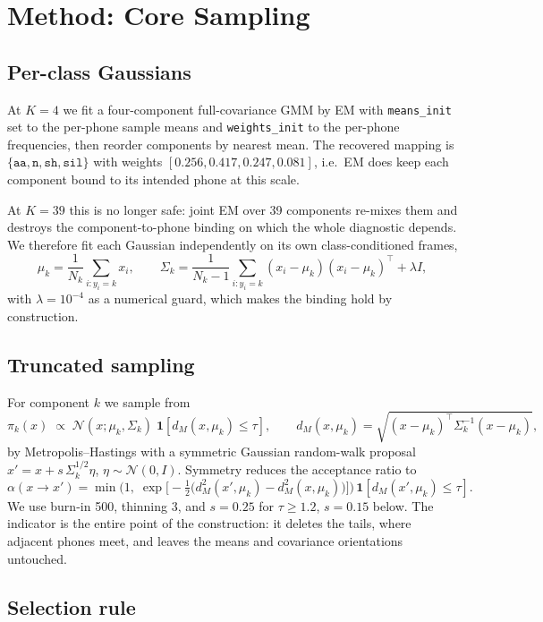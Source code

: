 \documentclass[11pt]{article}
\newcommand{\ph}[1]{\texttt{#1}}
\begin{document}
\section{Method: Core Sampling}
\label{sec:method}

\subsection{Per-class Gaussians}

At $K=4$ we fit a four-component full-covariance GMM by EM with
\texttt{means\_init} set to the per-phone sample means and \texttt{weights\_init}
to the per-phone frequencies, then reorder components by nearest mean. The
recovered mapping is $\{\ph{aa}, \ph{n}, \ph{sh}, \ph{sil}\}$ with weights
$[0.256, 0.417, 0.247, 0.081]$, i.e.\ EM does keep each component bound to its
intended phone at this scale.

At $K=39$ this is no longer safe: joint EM over 39 components re-mixes them and
destroys the component-to-phone binding on which the whole diagnostic depends.
We therefore fit each Gaussian independently on its own class-conditioned
frames,
\[
\mu_k = \frac{1}{N_k}\!\!\sum_{i:y_i=k}\!\! x_i,
\qquad
\Sigma_k = \frac{1}{N_k-1}\!\!\sum_{i:y_i=k}\!\!(x_i-\mu_k)(x_i-\mu_k)^{\!\top}
+ \lambda I,
\]
with $\lambda = 10^{-4}$ as a numerical guard, which makes the binding hold by
construction.

\subsection{Truncated sampling}

For component $k$ we sample from
\[
\pi_k(x) \;\propto\; \mathcal{N}(x;\mu_k,\Sigma_k)\;
\mathbf{1}\!\left[d_M(x,\mu_k)\le\tau\right],
\qquad
d_M(x,\mu_k)=\sqrt{(x-\mu_k)^{\!\top}\Sigma_k^{-1}(x-\mu_k)},
\]
by Metropolis--Hastings with a symmetric Gaussian random-walk proposal
$x' = x + s\,\Sigma_k^{1/2}\eta$, $\eta\sim\mathcal{N}(0,I)$. Symmetry reduces
the acceptance ratio to
\[
\alpha(x\to x') = \min\!\Big(1,\;
\exp\!\big[-\tfrac{1}{2}\big(d_M^2(x',\mu_k)-d_M^2(x,\mu_k)\big)\big]\Big)\,
\mathbf{1}\!\left[d_M(x',\mu_k)\le\tau\right].
\]
We use burn-in 500, thinning 3, and $s = 0.25$ for $\tau \ge 1.2$, $s = 0.15$
below. The indicator is the entire point of the construction: it deletes the
tails, where adjacent phones meet, and leaves the means and covariance
orientations untouched.

\subsection{Selection rule}
\end{document}
